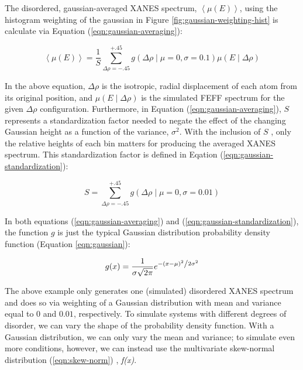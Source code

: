 The disordered, gaussian-averaged XANES spectrum, $ \left\langle \mu(E) \right\rangle $, using the histogram weighting of the gaussian in Figure \ref{fig:gaussian-weighting-hist} is calculate via Equation (\ref{eqn:gaussian-averaging}):

\begin{equation}
	\label{eqn:gaussian-averaging}
	\left\langle \mu(E) \right\rangle  = \frac{1}{S} \sum_{\Delta\rho=-.45}^{+.45} g\left(\Delta \rho \mid \mu=0, \sigma=0.1\right) \mu(E \mid \Delta\rho)
\end{equation}

\noindent
In the above equation, $ \Delta\rho $ is the isotropic, radial displacement of each atom from its original position, and $ \mu(E \mid \Delta\rho) $ is the simulated FEFF spectrum for the given $ \Delta\rho $ configuration. Furthermore, in Equation (\ref{eqn:gaussian-averaging}), $ S $ represents a standardization factor needed to negate the effect of the changing Gaussian height as a function of the variance, $ \sigma^2 $. With the inclusion of $ S $ , only the relative heights of each bin matters for producing the averaged XANES spectrum. This standardization factor is defined in Eqation (\ref{eqn:gaussian-standardization}):

\begin{equation}
	\label{eqn:gaussian-standardization}
	S = \sum_{\Delta\rho=-.45}^{+.45} g\left(\Delta \rho \mid \mu=0, \sigma=0.01\right)
\end{equation}

\noindent
In both equations (\ref{eqn:gaussian-averaging}) and (\ref{eqn:gaussian-standardization}), the function $ g $ is just the typical Gaussian distribution probability density function (Equation \ref{eqn:gaussian}): 

\begin{equation}
	\label{eqn:gaussian}
	g(x) = \frac{1}{{\sigma \sqrt {2\pi } }}e^{{{ - \left( {x - \mu } \right)^2 } \mathord{\left/ {\vphantom {{ - \left( {x - \mu } \right)^2 } {2\sigma ^2 }}} \right. \kern-\nulldelimiterspace} {2\sigma ^2 }}}
\end{equation}

The above example only generates one (simulated) disordered XANES spectrum and does so via weighting of a Gaussian distribution with mean and variance equal to $ 0 $ and $ 0.01 $, respectively. To simulate systems with different degrees of disorder, we can vary the shape of the probability density function. With a Gaussian distribution, we can only vary the mean and variance; to simulate even more conditions, however, we can instead use the multivariate skew-normal distribution (\ref{eqn:skew-norm}) \cite{skewnorm_Azzalini_1999} \cite{2020SciPy-NMeth}, \textit{f(x)}. 

